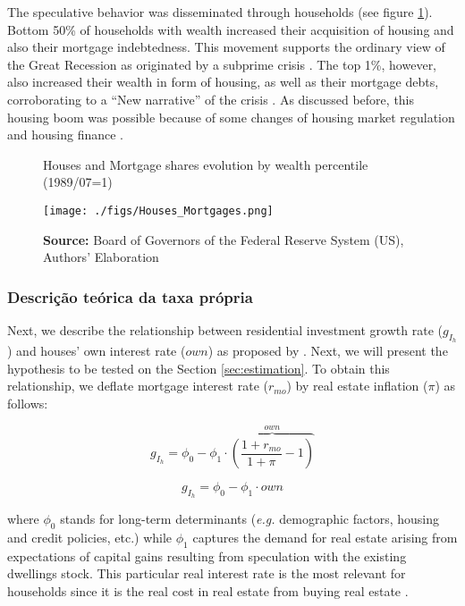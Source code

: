 \documentclass[12pt, a4paper]{article}
\begin{document}
The speculative behavior was disseminated through households (see figure \ref{fig:mort_houses}).
Bottom 50\% of households with wealth increased their acquisition of housing and also their mortgage indebtedness.
This movement supports the ordinary view of the Great Recession as originated by a subprime crisis \cite{mian_consequences_2009}.
The top 1\%, however, also increased their wealth in form of housing, as well as their mortgage debts, corroborating to a ``New narrative'' of the crisis \cite{albanesi_2017_Credit}.
As discussed before, this housing boom was possible because of some changes of housing market regulation and housing finance \cite{federal_deposit_insurance_corporation_savings_1997,mccarthyMonetaryPolicyTransmission2002,wall_too_2010}.

\begin{figure}[H]
	\centering
	\caption{Houses and Mortgage shares evolution by wealth percentile (1989/07=1)}
	\label{fig:mort_houses}
	\texttt{[image: ./figs/Houses\_Mortgages.png]}
	\caption*{\textbf{Source:} Board of Governors of the Federal Reserve System (US), Authors' Elaboration}
\end{figure}


\subsubsection{Descrição teórica da taxa própria}
\label{sec:org4c21b33}
Next, we describe the relationship between residential investment growth rate (\(g_{I_h}\)) and houses' own interest rate (\(own\)) as proposed by \textcite{teixeira_crescimento_2015}.
Next, we will present the hypothesis to be tested on the Section \ref{sec:estimation}. To obtain this relationship, we deflate mortgage interest rate (\(r_{mo}\)) by real estate inflation (\(\pi\)) as follows:

$$
g_{I_h} = \phi_0 - \phi_1\cdot \overbrace{\left(\frac{1+r_{mo}}{1+\pi} - 1\right)}^{own}
$$

\begin{equation}
g_{I_h} = \phi_0 - \phi_1\cdot own
\end{equation}

where \(\phi_0\) stands for long-term determinants (\emph{e.g.} demographic factors, housing and credit policies, etc.) while \(\phi_1\) captures the demand for real estate arising from expectations of capital gains resulting from speculation with the existing dwellings stock.
This particular real interest rate is the most relevant for households since it is the real cost in real estate from buying real estate  \cite[p.~53]{teixeira_crescimento_2015}.
\end{document}
